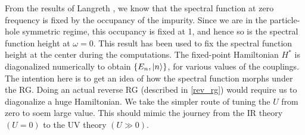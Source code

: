 \documentclass[twoside,11pt]{report}
\numberwithin{equation}{section}
\begin{document}
From the results of Langreth \cite{langreth}, we know that the spectral function at zero frequency is fixed by the occupancy of the impurity. Since we are in the particle-hole symmetric regime, this occupancy is fixed at 1, and hence so is the spectral function height at \(\omega = 0\). This result has been used to fix the spectral function height at the center during the computations. The fixed-point Hamiltonian \(H^*\) is diagonalized numerically to obtain \(\left\{E_n, \ket{n}\right\}\), for various values of the couplings. The intention here is to get an idea of how the spectral function morphs under the RG. Doing an actual reverse RG (described in \ref{rev_rg}) would require us to diagonalize a huge Hamiltonian. We take the simpler route of tuning the \(U\) from zero to soem large value. This should mimic the journey from the IR theory \((U=0)\) to the UV theory \((U \gg 0)\).
\end{document}
